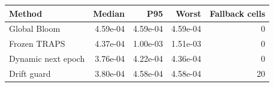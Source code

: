 \begin{tabular}{lrrrr}
\toprule
Method & Median & P95 & Worst & Fallback cells \\
\midrule
Global Bloom & 4.59e-04 & 4.59e-04 & 4.59e-04 & 0 \\
Frozen TRAPS & 4.37e-04 & 1.00e-03 & 1.51e-03 & 0 \\
Dynamic next epoch & 3.76e-04 & 4.22e-04 & 4.36e-04 & 0 \\
Drift guard & 3.80e-04 & 4.58e-04 & 4.58e-04 & 20 \\
\bottomrule
\end{tabular}
